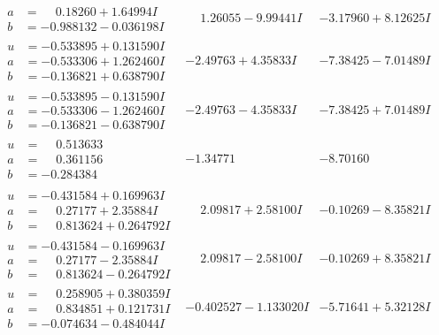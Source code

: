 \documentclass[1p]{elsarticle_modified}
\theoremstyle{definition}
\begin{document}
$$\begin{array}{c|c|c}
\begin{aligned}
a &= \phantom{-}0.18260 + 1.64994 I \\
b &= -0.988132 - 0.036198 I\end{aligned}
 & \phantom{-}1.26055 - 9.99441 I & -3.17960 + 8.12625 I \\ \hline\begin{aligned}
u &= -0.533895 + 0.131590 I \\
a &= -0.533306 + 1.262460 I \\
b &= -0.136821 + 0.638790 I\end{aligned}
 & -2.49763 + 4.35833 I & -7.38425 - 7.01489 I \\ \hline\begin{aligned}
u &= -0.533895 - 0.131590 I \\
a &= -0.533306 - 1.262460 I \\
b &= -0.136821 - 0.638790 I\end{aligned}
 & -2.49763 - 4.35833 I & -7.38425 + 7.01489 I \\ \hline\begin{aligned}
u &= \phantom{-}0.513633\phantom{ +0.000000I} \\
a &= \phantom{-}0.361156\phantom{ +0.000000I} \\
b &= -0.284384\phantom{ +0.000000I}\end{aligned}
 & -1.34771\phantom{ +0.000000I} & -8.70160\phantom{ +0.000000I} \\ \hline\begin{aligned}
u &= -0.431584 + 0.169963 I \\
a &= \phantom{-}0.27177 + 2.35884 I \\
b &= \phantom{-}0.813624 + 0.264792 I\end{aligned}
 & \phantom{-}2.09817 + 2.58100 I & -0.10269 - 8.35821 I \\ \hline\begin{aligned}
u &= -0.431584 - 0.169963 I \\
a &= \phantom{-}0.27177 - 2.35884 I \\
b &= \phantom{-}0.813624 - 0.264792 I\end{aligned}
 & \phantom{-}2.09817 - 2.58100 I & -0.10269 + 8.35821 I \\ \hline\begin{aligned}
u &= \phantom{-}0.258905 + 0.380359 I \\
a &= \phantom{-}0.834851 + 0.121731 I \\
b &= -0.074634 - 0.484044 I\end{aligned}
 & -0.402527 - 1.133020 I & -5.71641 + 5.32128 I \\ \hline\begin{aligned}

\end{aligned}
\end{array}$$
\end{document}
